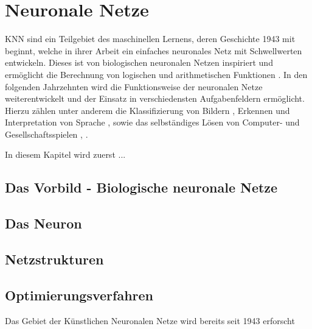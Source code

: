 \section{Neuronale Netze}
\ac{KNN} sind ein Teilgebiet des maschinellen Lernens, deren Geschichte 1943 mit \citeauthor{mcculloch1943logical} beginnt, welche in ihrer Arbeit ein einfaches neuronales Netz mit Schwellwerten entwickeln. Dieses ist von biologischen neuronalen Netzen inspiriert und ermöglicht die Berechnung von logischen und arithmetischen Funktionen \cite{mcculloch1943logical}. In den folgenden Jahrzehnten wird die Funktionsweise der neuronalen Netze weiterentwickelt und der Einsatz in verschiedensten Aufgabenfeldern ermöglicht. Hierzu zählen unter anderem die Klassifizierung von Bildern \cite{krizhevsky2012imagenet}, Erkennen und Interpretation von Sprache \cite{hinton2012deep}, \cite{andor2016globally} sowie das selbständiges Lösen von Computer- und Gesellschaftsspielen \cite{mnih2013playing}, \cite{silver2016mastering}. 

In diesem Kapitel wird zuerst ...
\subsection{Das Vorbild - Biologische neuronale Netze}
\subsection{Das Neuron}
\subsection{Netzstrukturen}
\subsection{Optimierungsverfahren}

Das Gebiet der Künstlichen Neuronalen Netze wird bereits seit 1943 erforscht